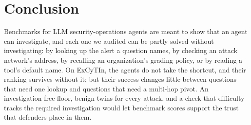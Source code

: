 \section{Conclusion}
\label{sec:conclusion}

Benchmarks for LLM security-operations agents are meant to show that an agent can investigate, and each one we audited can be partly solved without investigating: by looking up the alert a question names, by checking an attack network's address, by recalling an organization's grading policy, or by reading a tool's default name. On ExCyTIn, the agents do not take the shortcut, and their ranking survives without it; but their success changes little between questions that need one lookup and questions that need a multi-hop pivot. An investigation-free floor, benign twins for every attack, and a check that difficulty tracks the required investigation would let benchmark scores support the trust that defenders place in them.

